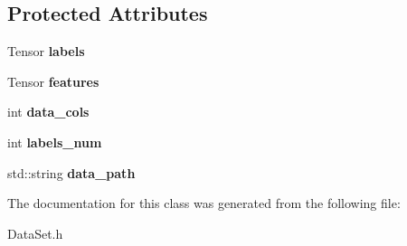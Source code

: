 \subsection*{Protected Attributes}
\begin{DoxyCompactItemize}
\item 
\mbox{\label{classDataSet_a3f5c00bae7ba79b68089db27d2ae7dba}} 
Tensor {\bfseries labels}
\item 
\mbox{\label{classDataSet_ae209670ecd93ea736dd2dcac8b291324}} 
Tensor {\bfseries features}
\item 
\mbox{\label{classDataSet_aab8c864d1f80a1d5700042e13b1446ce}} 
int {\bfseries data\+\_\+cols}
\item 
\mbox{\label{classDataSet_ad55a8607588c2d2da5be092eb0e6f5c7}} 
int {\bfseries labels\+\_\+num}
\item 
\mbox{\label{classDataSet_aa6fa891da9f20f7d79828922873a44a8}} 
std\+::string {\bfseries data\+\_\+path}
\end{DoxyCompactItemize}


The documentation for this class was generated from the following file\+:\begin{DoxyCompactItemize}
\item 
Data\+Set.\+h\end{DoxyCompactItemize}
